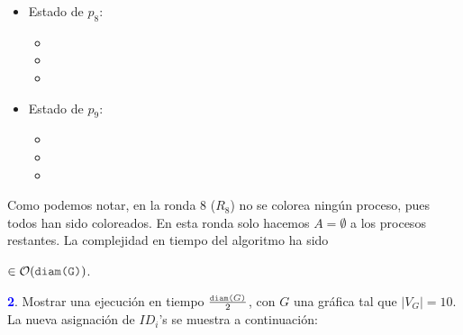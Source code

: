 \begin{multicols}{2}
\begin{itemize}
\begin{itemize}
      \item {}
      \end{itemize}

\item Estado de $p_8$:
      \begin{itemize}
      \item {}
      
      \item {}
      
      \item {}
      \end{itemize}

\item Estado de $p_9$:
      \begin{itemize}
      \item {}
      
      \item {}
      
      \item {}
      \end{itemize}

\end{itemize}
\end{multicols} 

Como podemos notar, en la ronda $8$ ($R_8$) no se colorea ningún proceso,
pues todos han sido coloreados. En esta ronda solo hacemos $A = \emptyset$
a los procesos restantes. La complejidad en tiempo del algoritmo ha sido
\begin{center}
         $\in \mathcal{O}(\code{diam(G)})$.
\end{center}
\newpage

\hspace*{0.5cm} \textbf{\textcolor{blue}{2}}. Mostrar una ejecución
en tiempo $\frac{\code{diam($G$)}}{2}$, con $G$ una gráfica tal que $|V_G| = 10$.
La nueva asignación de $ID_i$'s se muestra a continuación:

